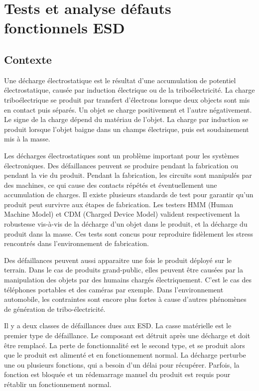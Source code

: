 \chapter{Tests et analyse défauts fonctionnels ESD}
\label{chap:1}
\section{Contexte}

Une décharge électrostatique est le résultat d'une accumulation de potentiel électrostatique, causée par induction électrique ou de la triboélectricité.
La charge triboélectrique se produit par transfert d'électrons lorsque deux objects sont mis en contact puis séparés.
Un objet se charge positivement et l'autre négativement.
Le signe de la charge dépend du matériau de l'objet.
La charge par induction se produit lorsque l'objet baigne dans un champs électrique, puis est soudainement mis à la masse.

Les décharges électrostatiques sont un problème important pour les systèmes électroniques.
Des défaillances peuvent se produire pendant la fabrication ou pendant la vie du produit.
Pendant la fabrication, les circuits sont manipulés par des machines, ce qui cause des contacts répétés et éventuellement une accumulation de charges.
Il existe plusieurs standards de test pour garantir qu'un produit peut survivre aux étapes de fabrication.
Les testers HMM (Human Machine Model) et CDM (Charged Device Model) valident respectivement la robustesse vis-à-vis de la décharge d'un objet dans le produit, et la décharge du produit dans la masse.
Ces tests sont concus pour reproduire fidèlement les stress rencontrés dans l'environnement de fabrication.

Des défaillances peuvent aussi apparaitre une fois le produit déployé sur le terrain.
Dans le cas de produits grand-public, elles peuvent être causées par la manipulation des objets par des humains chargés électriquement.
C'est le cas des téléphones portables et des caméras par exemple.
Dans l'environnement automobile, les contraintes sont encore plus fortes à cause d'autres phénomènes de génération de tribo-électricité.

Il y a deux classes de défaillances dues aux ESD.
La casse matérielle est le premier type de défaillance.
Le composant est détruit après une décharge et doit être remplacé.
La perte de fonctionnalité est le second type, et se produit alors que le produit est alimenté et en fonctionnement normal.
La décharge perturbe une ou plusieurs fonctions, qui a besoin d'un délai pour récupérer.
Parfois, la fonction est bloquée et un rédemarrage manuel du produit est requis pour rétablir un fonctionnement normal.

